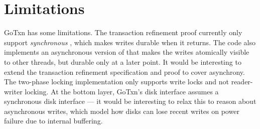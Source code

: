 





\section{Limitations}
\label{sec:txn:limitations}

GoTxn has some limitations. The transaction refinement proof currently only support
\emph{synchronous} , which makes writes durable when it returns. The
code also implements an asynchronous version of  that makes the
writes atomically visible to other threads, but durable only at a later point.
It would be interesting to extend the transaction refinement specification and proof
to cover asynchrony. The two-phase locking implementation only supports write
locks and not reader-writer locking. At the bottom layer, GoTxn's disk interface
assumes a synchronous disk interface --- it would be interesting to relax this
to reason about asynchronous writes, which model how disks can lose recent
writes on power failure due to internal buffering.


